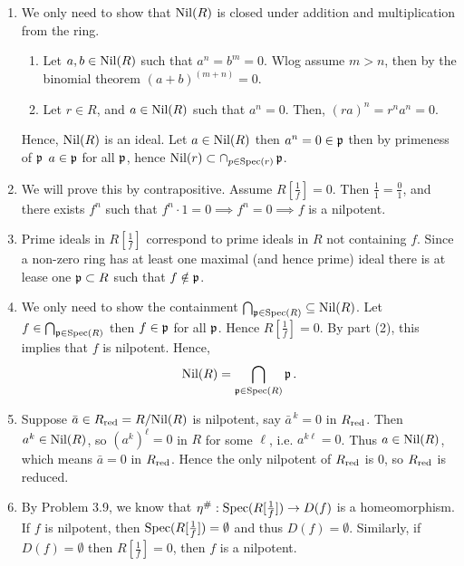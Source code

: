 \documentclass[Notebook.tex]{subfiles}
\begin{document}
\begin{solution}
    \bbni
    \begin{enumerate}
        \item We only need to show that $\text{Nil}(R)$ is closed under addition and multiplication from the ring. 
        \begin{enumerate}
            \item Let $a, b \in \text{Nil}(R)$ such that $a^n = b^m = 0$. Wlog assume $m>n$, then by the binomial theorem $(a+b)^(m+n)  = 0$. 
            \item Let $r \in R$, and $a \in \text{Nil}(R)$ such that $a^n = 0$. Then, $(ra)^n = r^n a^n = 0$. 
        \end{enumerate}
        Hence, $\text{Nil}(R)$ is an ideal. Let $a \in \text{Nil}(R)$ then $a^n = 0 \in \operatorname{\mathfrak{p}}$ then by primeness of $\operatorname{\mathfrak{p}}$ $a \in \operatorname{\mathfrak{p}}$ for all $\operatorname{\mathfrak{p}}$, hence $\text{Nil}(r) \subset \cap_{p \in \operatorname{Spec}(r)} \operatorname{\mathfrak{p}}$. 
        
        \item We will prove this by contrapositive. Assume $R[\frac{1}{f}] = 0$. Then $\frac{1}{1} = \frac{0}{1}$, and there exists $f^n$ such that $f^n \cdot 1 = 0 \implies f^n = 0 \implies f$ is a nilpotent. 
        
        \item Prime ideals in $R[\frac{1}{f}]$ correspond to prime ideals in $R$ not containing $f$. Since a non-zero ring has at least one maximal (and hence prime) ideal there is at lease one $\operatorname{\mathfrak{p}} \subset R$ such that $f \notin \operatorname{\mathfrak{p}}$. 
        
        \item We only need to show the containment $\bigcap_{\operatorname{\mathfrak{p}} \in \operatorname{Spec}(R)} \subseteq \text{Nil}(R)$. Let $f \in \bigcap_{\operatorname{\mathfrak{p}} \in \operatorname{Spec}(R)}$ then $f \in \operatorname{\mathfrak{p}}$ for all $\operatorname{\mathfrak{p}}$. Hence $R[\frac{1}{f}] = 0$. By part (2), this implies that $f$ is nilpotent. Hence, 
        \[
        \text{Nil}(R)=\bigcap_{\operatorname{\mathfrak{p}}\in \operatorname{Spec}(R)}\operatorname{\mathfrak{p}}. 
        \]

        \item Suppose $\bar a \in R_{\text{red}} = R/\text{Nil}(R)$ is nilpotent, say $\bar a^{\,k} = 0$ in $R_{\text{red}}$. Then $a^k \in \text{Nil}(R)$, so $(a^k)^\ell = 0$ in $R$ for some $\ell$, i.e. $a^{k\ell} = 0$. Thus $a \in \text{Nil}(R)$, which means $\bar a = 0$ in $R_{\text{red}}$. Hence the only nilpotent of $R_{\text{red}}$ is $0$, so $R_{\text{red}}$ is reduced.
        
        \item By Problem 3.9, we know that $\eta^{\#}: \operatorname{Spec}(R[\frac{1}{f}]) \to D(f)$ is a homeomorphism. If $f$ is nilpotent, then $\operatorname{Spec}(R[\frac{1}{f}]) = \emptyset$ and thus $D(f) = \emptyset$. Similarly, if $D(f) = \emptyset$ then $R[\frac{1}{f}] = 0$, then $f$ is a nilpotent. 
        

\end{enumerate}
\end{solution}
\end{document}
